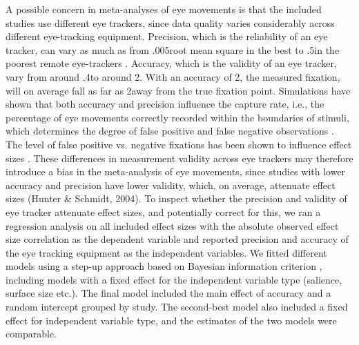 \documentclass{article}
\begin{document}
A possible concern in meta-analyses of eye movements is that the included studies use different eye trackers, since data quality varies considerably across different eye-tracking equipment. Precision, which is the reliability of an eye tracker, can vary as much as from .005\degree root mean square in the best to .5\degree in the poorest remote eye-trackers \citep{holmqvist2015a}. Accuracy, which is the validity of an eye tracker, vary from around .4\degree to around 2\degree \citep{holmqvist2015a}. With an accuracy of 2\degree, the measured fixation, will on average fall as far as 2\degree away from the true fixation point. Simulations have shown that both accuracy and precision influence the capture rate, i.e., the percentage of eye movements correctly recorded within the boundaries of stimuli, which determines the degree of false positive and false negative observations \citep{orquin2018a,orquin2019a}. The level of false positive vs. negative fixations has been shown to influence effect sizes \citep{orquin2016a}. These differences in measurement validity across eye trackers may therefore introduce a bias in the meta-analysis of eye movements, since studies with lower accuracy and precision have lower validity, which, on average, attenuate effect sizes (Hunter \& Schmidt, 2004). To inspect whether the precision and validity of eye tracker attenuate effect sizes, and potentially correct for this, we ran a regression analysis on all included effect sizes with the absolute observed effect size correlation as the dependent variable and reported precision and accuracy of the eye tracking equipment as the independent variables. We fitted different models using a step-up approach \citep{ryoo2011model} based on Bayesian information criterion \citep{Schwarz1978}, including models with a fixed effect for the independent variable type (salience, surface size etc.). The final model included the main effect of accuracy and a random intercept grouped by study. The second-best model also included a fixed effect for independent variable type, and the estimates of the two models were comparable.
\end{document}
